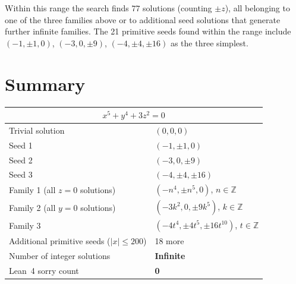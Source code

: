 \documentclass[12pt,a4paper]{article}
\theoremstyle{definition}
\newcommand{\Z}{\mathbb{Z}}
\begin{document}
Within this range the search finds $77$ solutions (counting $\pm z$), all belonging
to one of the three families above or to additional seed solutions that generate
further infinite families.  The 21 primitive seeds found within the range include
$(-1, \pm 1, 0)$, $(-3, 0, \pm 9)$, $(-4, \pm 4, \pm 16)$ as the three simplest.

\section{Summary}\label{sec:summary}

\begin{center}
\renewcommand{\arraystretch}{1.4}
\begin{tabular}{ll}
\toprule
\multicolumn{2}{c}{$x^5 + y^4 + 3z^2 = 0$} \\
\midrule
Trivial solution & $(0,0,0)$ \\
Seed 1 & $(-1, \pm 1, 0)$ \\
Seed 2 & $(-3, 0, \pm 9)$ \\
Seed 3 & $(-4, \pm 4, \pm 16)$ \\
Family 1 (all $z=0$ solutions) & $(-n^4, \pm n^5, 0)$, $n \in \Z$ \\
Family 2 (all $y=0$ solutions) & $(-3k^2, 0, \pm 9k^5)$, $k \in \Z$ \\
Family 3 & $(-4t^4, \pm 4t^5, \pm 16t^{10})$, $t \in \Z$ \\
Additional primitive seeds ($|x| \leq 200$) & 18 more \\
\midrule
Number of integer solutions & \textbf{Infinite} \\
Lean~4 sorry count & \textbf{0} \\
\bottomrule
\end{tabular}
\end{center}
\end{document}
